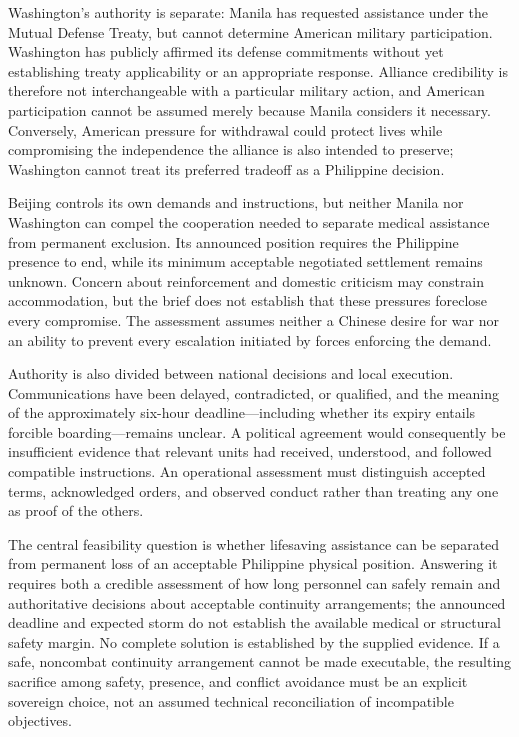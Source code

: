 \documentclass[11pt]{article}
\begin{document}
Washington’s authority is separate: Manila has requested assistance under the Mutual Defense Treaty, but cannot determine American military participation. Washington has publicly affirmed its defense commitments without yet establishing treaty applicability or an appropriate response. Alliance credibility is therefore not interchangeable with a particular military action, and American participation cannot be assumed merely because Manila considers it necessary. Conversely, American pressure for withdrawal could protect lives while compromising the independence the alliance is also intended to preserve; Washington cannot treat its preferred tradeoff as a Philippine decision.

Beijing controls its own demands and instructions, but neither Manila nor Washington can compel the cooperation needed to separate medical assistance from permanent exclusion. Its announced position requires the Philippine presence to end, while its minimum acceptable negotiated settlement remains unknown. Concern about reinforcement and domestic criticism may constrain accommodation, but the brief does not establish that these pressures foreclose every compromise. The assessment assumes neither a Chinese desire for war nor an ability to prevent every escalation initiated by forces enforcing the demand.

Authority is also divided between national decisions and local execution. Communications have been delayed, contradicted, or qualified, and the meaning of the approximately six-hour deadline—including whether its expiry entails forcible boarding—remains unclear. A political agreement would consequently be insufficient evidence that relevant units had received, understood, and followed compatible instructions. An operational assessment must distinguish accepted terms, acknowledged orders, and observed conduct rather than treating any one as proof of the others.

The central feasibility question is whether lifesaving assistance can be separated from permanent loss of an acceptable Philippine physical position. Answering it requires both a credible assessment of how long personnel can safely remain and authoritative decisions about acceptable continuity arrangements; the announced deadline and expected storm do not establish the available medical or structural safety margin. No complete solution is established by the supplied evidence. If a safe, noncombat continuity arrangement cannot be made executable, the resulting sacrifice among safety, presence, and conflict avoidance must be an explicit sovereign choice, not an assumed technical reconciliation of incompatible objectives.
\end{document}
